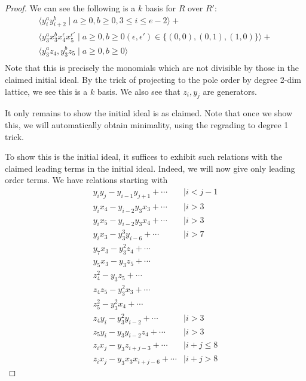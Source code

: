 \documentclass{amsart}
\theoremstyle{plain}
\theoremstyle{definition}
\theoremstyle{remark}
\numberwithin{equation}{section}
\begin{document}
\begin{proof}
We can see the following is a $k$ basis for $R$ over $R'$:
\begin{align*}
	\langle y_i^ay_{i+2}^b \mid a \geq 0,b\geq 0, 3 \leq i \leq e-2\rangle +\\
	\langle y_3^ax_3^b x_4^\epsilon x_5^{\epsilon'} \mid a \geq 0, b \geq 0(\epsilon,\epsilon') \in \{(0,0),(0,1),(1,0)\} \rangle +\\
	\langle y_3^az_4,y_3^bz_5 \mid a \geq 0, b \geq 0 \rangle\\
\end{align*}
Note that this is precisely the monomials which are not divisible by those in the claimed initial ideal. By the trick of projecting to the pole order by degree 2-dim lattice, we see this is a $k$ basis. We also see that $z_i,y_j$ are generators. 

It only remains to show the initial ideal is as claimed. Note that once we show this, we will automatically obtain minimality, using the regrading to degree 1 trick.

To show this is the initial ideal, it suffices to exhibit such relations with the claimed leading terms in the initial ideal. Indeed, we will now give only leading order terms. We have relations starting with
\begin{align*}
	y_iy_j - y_{i-1}y_{j+1} + \cdots &\mid i < j-1 \\
	y_ix_4 - y_{i-2}y_3x_3 + \cdots & \mid i > 3\\
	y_ix_5 - y_{i-2}y_3x_4 + \cdots & \mid i > 3\\
	y_ix_3-y_3^3y_{i-6} + \cdots &\mid i > 7\\
	y_7x_3-y_3^2 z_4 + \cdots \\
	y_5x_3 - y_3z_5 + \cdots \\
	z_4^2 - y_3 z_5 + \cdots \\
	z_4z_5 - y_3^2x_3 + \cdots \\
 	z_5^2 - y_3^2 x_4 + \cdots \\
 	z_4 y_i - y_3^2 y_{i-2} + \cdots &\mid i > 3 \\
 	z_5 y_i - y_3y_{i-2}z_4 + \cdots &\mid i > 3 \\
 	z_i x_j - y_3 z_{i+j-3} + \cdots &\mid i+j \leq 8 \\
 	z_i x_j - y_3x_3x_{i+j-6} + \cdots &\mid i+j > 8
\end{align*}
\end{proof}
\end{document}
